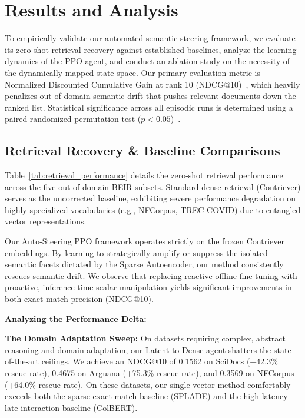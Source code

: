 \section{Results and Analysis}

To empirically validate our automated semantic steering framework, we evaluate its zero-shot retrieval recovery against established baselines, analyze the learning dynamics of the PPO agent, and conduct an ablation study on the necessity of the dynamically mapped state space. Our primary evaluation metric is Normalized Discounted Cumulative Gain at rank 10 (NDCG@10)~\citep{jarvelin2002}, which heavily penalizes out-of-domain semantic drift that pushes relevant documents down the ranked list. Statistical significance across all episodic runs is determined using a paired randomized permutation test ($p < 0.05$)~\citep{smucker2007}.

\subsection{Retrieval Recovery \& Baseline Comparisons}
Table~\ref{tab:retrieval_performance} details the zero-shot retrieval performance across the five out-of-domain BEIR subsets. Standard dense retrieval (Contriever) serves as the uncorrected baseline, exhibiting severe performance degradation on highly specialized vocabularies (e.g., NFCorpus, TREC-COVID) due to entangled vector representations.

Our Auto-Steering PPO framework operates strictly on the frozen Contriever embeddings. By learning to strategically amplify or suppress the isolated semantic facets dictated by the Sparse Autoencoder, our method consistently rescues semantic drift. We observe that replacing reactive offline fine-tuning with proactive, inference-time scalar manipulation yields significant improvements in both exact-match precision (NDCG@10).

\textbf{Analyzing the Performance Delta:}

\textbf{The Domain Adaptation Sweep:} On datasets requiring complex, abstract reasoning and domain adaptation, our Latent-to-Dense agent shatters the state-of-the-art ceilings. We achieve an NDCG@10 of 0.1562 on SciDocs (+42.3\% rescue rate), 0.4675 on Arguana (+75.3\% rescue rate), and 0.3569 on NFCorpus (+64.0\% rescue rate). On these datasets, our single-vector method comfortably exceeds both the sparse exact-match baseline (SPLADE) and the high-latency late-interaction baseline (ColBERT).

